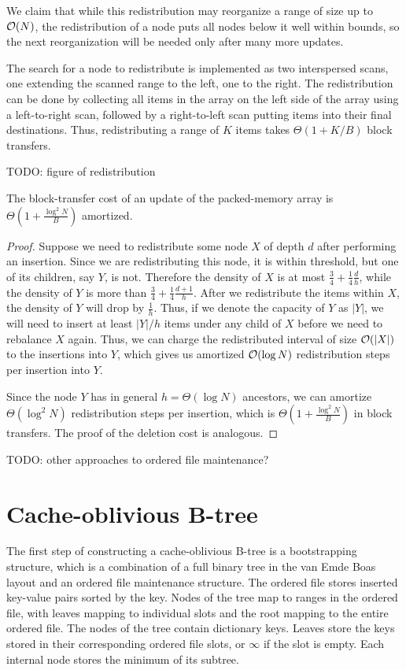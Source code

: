 We claim that while this redistribution may reorganize a range of size up
to $\mathcal{O}(N)$, the redistribution of a node puts all nodes below it well within
bounds, so the next reorganization will be needed only after many more updates.

The search for a node to redistribute is implemented as two interspersed scans,
one extending the scanned range to the left, one to the right. The
redistribution can be done by collecting all items in the array on the left side
of the array using a left-to-right scan, followed by a right-to-left scan
putting items into their final destinations. Thus,
redistributing a range of $K$ items takes $\Theta(1+K/B)$ block transfers.

TODO: figure of redistribution

\begin{theorem}
The block-transfer cost of an update of the packed-memory array
is $\Theta(1+\frac{\log^2 N}{B})$ amortized.
\end{theorem}

\begin{proof}
Suppose we need to redistribute some node $X$ of depth $d$ after performing
an insertion. Since we are redistributing this node, it is within threshold,
but one of its children, say $Y$, is not.
Therefore the density of $X$ is at most
$\frac{3}{4}+\frac{1}{4}\frac{d}{h}$, while the density of $Y$ is more than
$\frac{3}{4}+\frac{1}{4}\frac{d+1}{h}$. After we redistribute the items within $X$,
the density of $Y$ will drop by $\frac{1}{h}$. Thus, if we denote the capacity
of $Y$ as $|Y|$, we will need to insert at least $|Y|/h$ items under any
child of $X$ before we need to rebalance $X$ again.
Thus, we can charge the redistributed interval of size $\mathcal{O}(|X|)$ to the
insertions into $Y$, which gives us amortized $\mathcal{O}(\log N)$
redistribution steps per insertion into $Y$.

Since the node $Y$ has in general $h=\Theta(\log N)$ ancestors, we can amortize
$\Theta(\log^2 N)$ redistribution steps per insertion, which is
$\Theta(1+\frac{\log^2 N}{B})$ in block transfers. The proof of the deletion
cost is analogous.
\end{proof}

TODO: other approaches to ordered file maintenance?

\section{Cache-oblivious B-tree}
The first step of constructing a cache-oblivious B-tree is a bootstrapping
structure, which is a combination of a full binary tree in
the van Emde Boas layout and an ordered file maintenance structure.
The ordered file stores inserted key-value pairs sorted by the key.
Nodes of the tree map to ranges in the ordered file, with leaves mapping
to individual slots and the root mapping to the entire ordered file.
The nodes of the tree contain dictionary keys.
Leaves store the keys stored in their corresponding ordered file slots,
or $\infty$ if the slot is empty. Each internal node stores the minimum
of its subtree.

